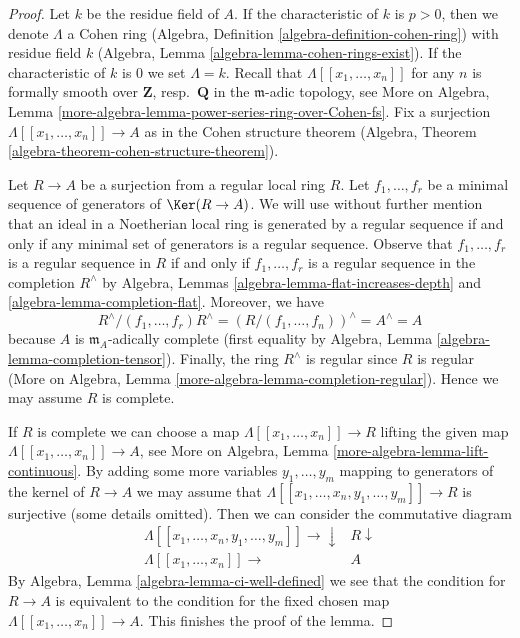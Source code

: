\begin{proof}
Let $k$ be the residue field of $A$. If the characteristic of
$k$ is $p > 0$, then we denote $\Lambda$ a Cohen ring
(Algebra, Definition \ref{algebra-definition-cohen-ring})
with residue field $k$ (Algebra, Lemma \ref{algebra-lemma-cohen-rings-exist}).
If the characteristic of $k$ is $0$ we set $\Lambda = k$.
Recall that $\Lambda[[x_1, \ldots, x_n]]$ for any $n$
is formally smooth over $\mathbf{Z}$, resp.\ $\mathbf{Q}$
in the $\mathfrak m$-adic topology, see
More on Algebra, Lemma
\ref{more-algebra-lemma-power-series-ring-over-Cohen-fs}.
Fix a surjection $\Lambda[[x_1, \ldots, x_n]] \to A$ as in
the Cohen structure theorem
(Algebra, Theorem \ref{algebra-theorem-cohen-structure-theorem}).

\medskip\noindent
Let $R \to A$ be a surjection from a regular local ring $R$.
Let $f_1, \ldots, f_r$ be a minimal sequence of generators
of $\Ker(R \to A)$. We will use without further mention
that an ideal in a Noetherian local ring is generated by a regular
sequence if and only if any minimal set of generators is a
regular sequence. Observe that $f_1, \ldots, f_r$
is a regular sequence in $R$ if and only if $f_1, \ldots, f_r$
is a regular sequence in the completion $R^\wedge$ by
Algebra, Lemmas \ref{algebra-lemma-flat-increases-depth} and
\ref{algebra-lemma-completion-flat}.
Moreover, we have
$$
R^\wedge/(f_1, \ldots, f_r)R^\wedge =
(R/(f_1, \ldots, f_n))^\wedge = A^\wedge = A
$$
because $A$ is $\mathfrak m_A$-adically complete (first equality by
Algebra, Lemma \ref{algebra-lemma-completion-tensor}). Finally,
the ring $R^\wedge$ is regular since $R$ is regular
(More on Algebra, Lemma \ref{more-algebra-lemma-completion-regular}).
Hence we may assume $R$ is complete.

\medskip\noindent
If $R$ is complete we can choose a map
$\Lambda[[x_1, \ldots, x_n]] \to R$ lifting the given map
$\Lambda[[x_1, \ldots, x_n]] \to A$, see
More on Algebra, Lemma \ref{more-algebra-lemma-lift-continuous}.
By adding some more variables $y_1, \ldots, y_m$ mapping
to generators of the kernel of $R \to A$ we may assume that
$\Lambda[[x_1, \ldots, x_n, y_1, \ldots, y_m]] \to R$ is surjective
(some details omitted). Then we can consider the commutative diagram
$$
\begin{array}{cc}\Lambda[[x_1, \ldots, x_n, y_1, \ldots, y_m]] \longrightarrow\downarrow & R \downarrow \\ \Lambda[[x_1, \ldots, x_n]] \longrightarrow & A\end{array}
$$
By Algebra, Lemma \ref{algebra-lemma-ci-well-defined} we see that
the condition for $R \to A$ is equivalent to the condition for
the fixed chosen map
$\Lambda[[x_1, \ldots, x_n]] \to A$. This finishes the proof of the lemma.
\end{proof}

